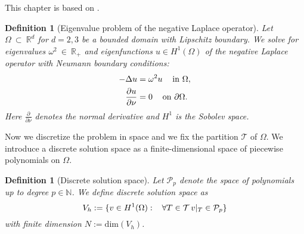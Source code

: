 \documentclass[a4paper,11pt,bibliography=totoc,listof=totoc,headinclude=true,cleardoublepage=empty,oneside]{scrbook}
\newtheorem{definition}[theorem]{Definition}
\newcommand{\R}{\mathbb{R}}
\newcommand{\N}{\mathbb{N}}
\begin{document}
This chapter is based on \cite{nannen}.
\begin{definition}[Eigenvalue problem of the negative Laplace operator]\label{def:ev problem}
    Let $\Omega~\subset~\R^d$ for $d=2,3$ be a bounded domain with Lipschitz boundary. We solve for eigenvalues $\omega^2~\in~\R_{+}$ and eigenfunctions $u\in H^1(\Omega)$ of the negative Laplace operator with Neumann boundary conditions:
        \begin{align}\begin{split}\label{eq:ev problem}
              -\Delta u &= \omega^2 u \hspace{.3cm} \text{ in } \Omega, \\
              \frac{\partial u}{\partial \nu} &= 0 \hspace{.3cm}\text{ on } \partial\Omega.
        \end{split}\end{align}
    Here $\frac{\partial}{\partial\nu}$ denotes the normal derivative and $H^1$ is the Sobolev space. 
\end{definition}
Now we discretize the problem in space and we fix the partition $\mathcal{T}$ of $\Omega$. We introduce a discrete solution space as a finite-dimensional space of piecewise polynomials on $\Omega$. 
\begin{definition}[Discrete solution space]\label{def:solution space}
    Let $\mathcal{P}_p$ denote the space of polynomials up to degree $p \in \N$. We define discrete solution space as  
    \begin{equation*}
        V_h := \{v \in H^1(\Omega): \hspace{.3cm} \forall T \in \mathcal{T} \, v|_T \in \mathcal{P}_p \}
    \end{equation*}
    with finite dimension $N := \mathrm{dim} (V_h)$. 
\end{definition}
\end{document}
